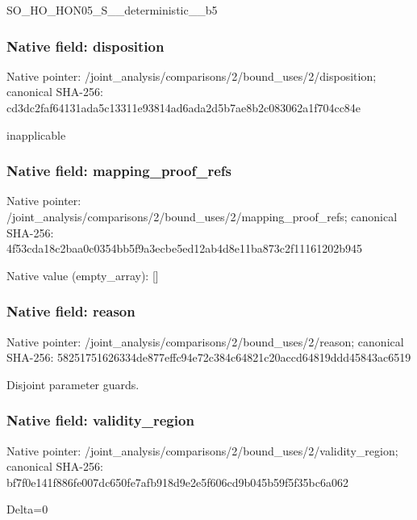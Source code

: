 \documentclass[10pt,a4paper]{article}
\begin{document}
\begingroup\raggedright\sloppy SO\_\allowbreak{}HO\_\allowbreak{}HON05\_\allowbreak{}S\_\allowbreak{}\_\allowbreak{}deterministic\_\allowbreak{}\_\allowbreak{}b5\par\endgroup

\subsubsection{Native field: disposition}
Native pointer: /joint\_\allowbreak{}analysis/comparisons/2/bound\_\allowbreak{}uses/2/disposition; canonical SHA-256: cd3dc2faf64131ada5c13311e93814ad6ada2d5b7ae8b2c083062a1f704cc84e

\begingroup\raggedright\sloppy inapplicable\par\endgroup

\subsubsection{Native field: mapping\_\allowbreak{}proof\_\allowbreak{}refs}
Native pointer: /joint\_\allowbreak{}analysis/comparisons/2/bound\_\allowbreak{}uses/2/mapping\_\allowbreak{}proof\_\allowbreak{}refs; canonical SHA-256: 4f53cda18c2baa0c0354bb5f9a3ecbe5ed12ab4d8e11ba873c2f11161202b945

Native value (empty\_\allowbreak{}array): []

\subsubsection{Native field: reason}
Native pointer: /joint\_\allowbreak{}analysis/comparisons/2/bound\_\allowbreak{}uses/2/reason; canonical SHA-256: 58251751626334de877effc94e72c384c64821c20accd64819ddd45843ac6519

\begingroup\raggedright\sloppy Disjoint parameter guards.\par\endgroup

\subsubsection{Native field: validity\_\allowbreak{}region}
Native pointer: /joint\_\allowbreak{}analysis/comparisons/2/bound\_\allowbreak{}uses/2/validity\_\allowbreak{}region; canonical SHA-256: bf7f0e141f886fe007dc650fe7afb918d9e2e5f606cd9b045b59f5f35bc6a062

\begingroup\raggedright\sloppy Delta=\allowbreak{}0\par\endgroup
\end{document}
